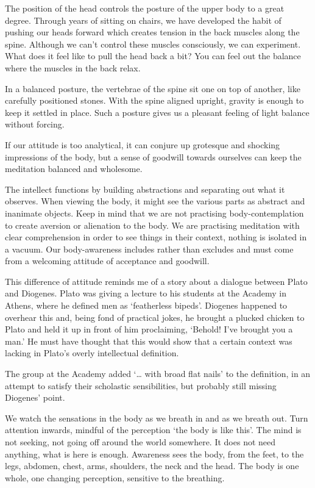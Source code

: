 The position of the head controls the posture of the upper body to a
great degree. Through years of sitting on chairs, we have developed the
habit of pushing our heads forward which creates tension in the back
muscles along the spine. Although we can't control these muscles
consciously, we can experiment. What does it feel like to pull the head
back a bit? You can feel out the balance where the muscles in the back
relax.

In a balanced posture, the vertebrae of the spine sit one on top of
another, like carefully positioned stones. With the spine aligned
upright, gravity is enough to keep it settled in place. Such a posture
gives us a pleasant feeling of light balance without forcing.


If our attitude is too analytical, it can conjure up grotesque and
shocking impressions of the body, but a sense of goodwill towards
ourselves can keep the meditation balanced and wholesome.

The intellect functions by building abstractions and separating out what
it observes. When viewing the body, it might see the various parts as
abstract and inanimate objects. Keep in mind that we are not practising
body-contemplation to create aversion or alienation to the body. We are
practising meditation with clear comprehension in order to see things in
their context, nothing is isolated in a vacuum. Our body-awareness
includes rather than excludes and must come from a welcoming attitude of
acceptance and goodwill.

This difference of attitude reminds me of a story about a dialogue
between Plato and Diogenes. Plato was giving a lecture to his students
at the Academy in Athens, where he defined men as `featherless bipeds'.
Diogenes happened to overhear this and, being fond of practical jokes,
he brought a plucked chicken to Plato and held it up in front of him
proclaiming, `Behold! I've brought you a man.' He must have thought that
this would show that a certain context was lacking in Plato's overly
intellectual definition.

The group at the Academy added `\ldots{} with broad flat nails' to the
definition, in an attempt to satisfy their scholastic sensibilities, but
probably still missing Diogenes' point.


We watch the sensations in the body as we breath in and as we breath
out. Turn attention inwards, mindful of the perception `the body is like
this'. The mind is not seeking, not going off around the world
somewhere. It does not need anything, what is here is enough. Awareness
sees the body, from the feet, to the legs, abdomen, chest, arms,
shoulders, the neck and the head. The body is one whole, one changing
perception, sensitive to the breathing.


